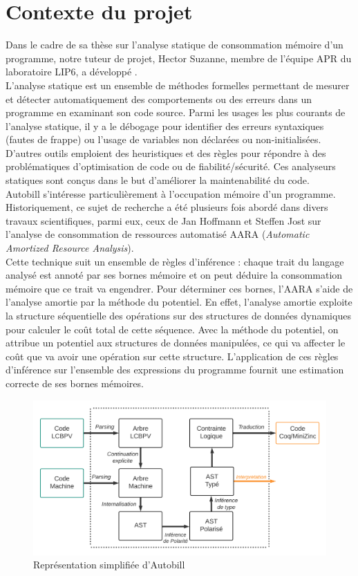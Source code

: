 \documentclass[12pt]{article}
\begin{document}
{
      \hypersetup{linkcolor=}
      \setcounter{tocdepth}{3}
      \tableofcontents
}
\newpage

\section{Contexte du projet}\label{contexte-du-projet}
Dans le cadre de sa thèse sur l'analyse statique de consommation
mémoire d'un programme, notre tuteur de projet, Hector Suzanne, membre de l'équipe APR du laboratoire LIP6, a développé \textbf{\cite{autobill}}. \\
L'analyse statique est un ensemble de méthodes formelles permettant de
mesurer et détecter automatiquement des comportements ou des erreurs dans un
programme en examinant son code source. Parmi les usages les plus courants
de l'analyse statique, il y a le débogage pour identifier des erreurs
syntaxiques (fautes de frappe) ou l'usage de variables non déclarées ou
non-initialisées. D'autres outils emploient des heuristiques et des règles pour répondre à des problématiques d'optimisation de code ou de fiabilité/sécurité. Ces analyseurs statiques sont conçus dans le but d'améliorer la maintenabilité du code. \\
Autobill s'intéresse particulièrement à l'occupation mémoire d'un programme. Historiquement,
ce sujet de recherche a été plusieurs fois abordé dans divers travaux scientifiques, parmi eux, ceux de Jan Hoffmann et Steffen Jost sur l'analyse de consommation de ressources automatisé AARA
\cite{Hoffmann} (\emph{Automatic Amortized
      Resource Analysis}).\\
Cette technique suit un ensemble de règles d'inférence : chaque trait du langage analysé est annoté par ses bornes mémoire et on peut déduire la consommation mémoire que ce trait va engendrer. Pour déterminer ces bornes, l'AARA s'aide de l'analyse amortie par la méthode du potentiel. En effet, l'analyse amortie exploite la structure séquentielle des opérations sur des structures de données dynamiques pour calculer le coût total de cette séquence. Avec la méthode du potentiel, on attribue un potentiel aux structures de données manipulées, ce qui va affecter le coût que va avoir une opération sur cette structure. L’application de ces règles d'inférence sur l'ensemble des expressions du programme fournit une estimation correcte de ses bornes mémoires.
\begin{figure}[!b]
      \centering
      \includegraphics[scale=0.55]{Figures/Schema_Autobill.png}
      \caption{Représentation simplifiée d'Autobill\label{fig1}}
\end{figure}
\end{document}
